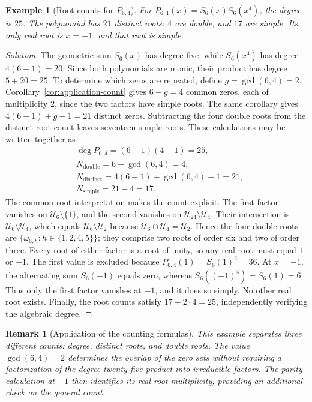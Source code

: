\documentclass[11pt,a4paper]{article}
\numberwithin{equation}{section}
\theoremstyle{uprightpaper}
\newtheorem{remark}{Remark}[section]
\newtheorem{example}{Example}[section]
\begin{document}
\begin{example}[Root counts for $P_{6,4}$]\label{exercise:two}
For $P_{6,4}(x)=S_6(x)S_6(x^4)$, the degree is $25$. The polynomial has $21$ distinct roots: $4$ are double, and $17$ are simple. Its only real root is $x=-1$, and that root is simple.
\end{example}
\begin{proof}[Solution]
The geometric sum $S_6(x)$ has degree five, while $S_6(x^4)$ has degree $4(6-1)=20$. Since both polynomials are monic, their product has degree $5+20=25$. To determine which zeros are repeated, define $g=\gcd(6,4)=2$. Corollary~\ref{cor:application-count} gives $6-g=4$ common zeros, each of multiplicity 2, since the two factors have simple roots. The same corollary gives $4(6-1)+g-1=21$ distinct zeros. Subtracting the four double roots from the distinct-root count leaves seventeen simple roots. These calculations may be written together as
\begin{subequations}\label{eq:exercise2-counts}
\begin{align}
 &\deg P_{6,4}=(6-1)(4+1)=25,\label{eq:exercise2-degree}\\
 &N_{\mathrm{double}}=6-\gcd(6,4)=4,\label{eq:exercise2-double}\\
 &N_{\mathrm{distinct}}=4(6-1)+\gcd(6,4)-1=21,\label{eq:exercise2-distinct}\\
 &N_{\mathrm{simple}}=21-4=17.\label{eq:exercise2-simple}
\end{align}
\end{subequations}
The common-root interpretation makes the count explicit. The first factor vanishes on $\mathcal U_6\setminus\{1\}$, and the second vanishes on $\mathcal U_{24}\setminus\mathcal U_4$. Their intersection is $\mathcal U_6\setminus\mathcal U_4$, which equals $\mathcal U_6\setminus\mathcal U_2$ because $\mathcal U_6\cap\mathcal U_4=\mathcal U_2$. Hence the four double roots are $\{\omega_{6,h}:h\in\{1,2,4,5\}\}$; they comprise two roots of order six and two of order three. Every root of either factor is a root of unity, so any real root must equal $1$ or $-1$. The first value is excluded because $P_{6,4}(1)=S_6(1)^2=36$. At $x=-1$, the alternating sum $S_6(-1)$ equals zero, whereas $S_6((-1)^4)=S_6(1)=6$. Thus only the first factor vanishes at $-1$, and it does so simply. No other real root exists. Finally, the root counts satisfy $17+2\cdot4=25$, independently verifying the algebraic degree.
\end{proof}

\begin{remark}[Application of the counting formulas]\label{rem:exercise-two}
This example separates three different counts: degree, distinct roots, and double roots. The value $\gcd(6,4)=2$ determines the overlap of the zero sets without requiring a factorization of the degree-twenty-five product into irreducible factors. The parity calculation at $-1$ then identifies its real-root multiplicity, providing an additional check on the general count.
\end{remark}
\end{document}

